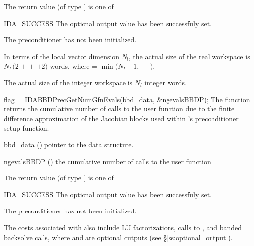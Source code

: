 {
  The return value  (of type ) is one of
  \begin{args}
  \item[IDA\_SUCCESS] 
    The optional output value has been successfuly set.
  \item[\Id{IDA\_PDATA\_NULL}]
    The {\idabbdpre} preconditioner has not been initialized.
  \end{args}
}
{
  In terms of the local vector dimension $N_l$, the actual size of the real workspace is
  $N_l \,(2$  $+$  $+$  $+2)$  words,
  where  = $\min ( N_l - 1 ,$  $+$ $)$.

  The actual size of the integer workspace is $N_l$ integer words.
}
{
  flag = IDABBDPrecGetNumGfnEvals(bbd\_data, \&ngevalsBBDP);
}
{
  The function  returns the
  cumulative number of calls to the user  function due to the 
  finite difference approximation of the Jacobian blocks used within
  {\idabbdpre}'s preconditioner setup function.
}
{
  \begin{args}[ngevalsBBDP]
  \item[bbd\_data] ()
    pointer to the {\idabbdpre} data structure.
  \item[ngevalsBBDP] ()
    the cumulative number of calls to the user  function.
  \end{args}
}
{
  The return value  (of type ) is one of
  \begin{args}
  \item[IDA\_SUCCESS] 
    The optional output value has been successfuly set.
  \item[\Id{IDA\_PDATA\_NULL}]
    The {\idabbdpre} preconditioner has not been initialized.
  \end{args}
}
{}

The costs associated with {\idabbdpre} also include  LU
factorizations,  calls to , and  banded
backsolve calls, where  and  are optional {\ida}
outputs (see \S\ref{ss:optional_output}).

